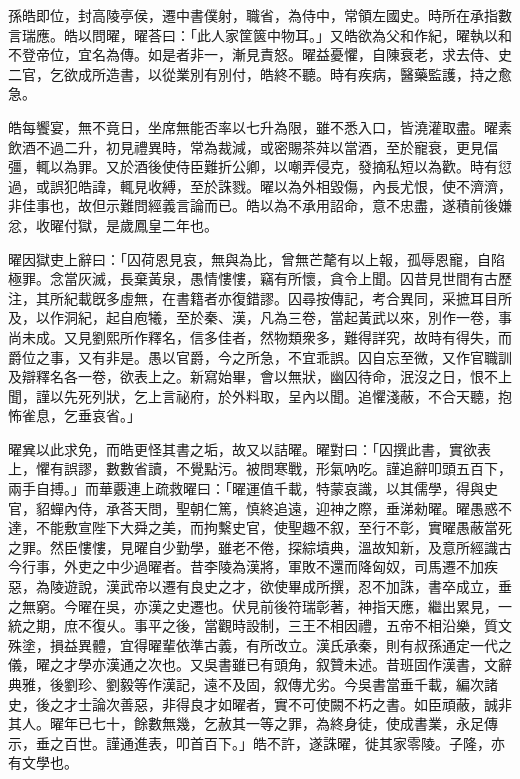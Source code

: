 \begin{pinyinscope}
 
 
 
 孫皓即位，封高陵亭侯，遷中書僕射，職省，為侍中，常領左國史。時所在承指數言瑞應。皓以問曜，曜荅曰：「此人家筐篋中物耳。」又皓欲為父和作紀，曜執以和不登帝位，宜名為傳。如是者非一，漸見責怒。曜益憂懼，自陳衰老，求去侍、史二官，乞欲成所造書，以從業別有別付，皓終不聽。時有疾病，醫藥監護，持之愈急。
 
 
 
 
 皓每饗宴，無不竟日，坐席無能否率以七升為限，雖不悉入口，皆澆灌取盡。曜素飲酒不過二升，初見禮異時，常為裁減，或密賜茶荈以當酒，至於寵衰，更見偪彊，輒以為罪。又於酒後使侍臣難折公卿，以嘲弄侵克，發摘私短以為歡。時有愆過，或誤犯皓諱，輒見收縛，至於誅戮。曜以為外相毀傷，內長尤恨，使不濟濟，非佳事也，故但示難問經義言論而已。皓以為不承用詔命，意不忠盡，遂積前後嫌忿，收曜付獄，是歲鳳皇二年也。
 
 
 
 
 曜因獄吏上辭曰：「囚荷恩見哀，無與為比，曾無芒氂有以上報，孤辱恩寵，自陷極罪。念當灰滅，長棄黃泉，愚情慺慺，竊有所懷，貪令上聞。囚昔見世間有古歷注，其所紀載旣多虛無，在書籍者亦復錯謬。囚尋按傳記，考合異同，采摭耳目所及，以作洞紀，起自庖犧，至於秦、漢，凡為三卷，當起黃武以來，別作一卷，事尚未成。又見劉熙所作釋名，信多佳者，然物類衆多，難得詳究，故時有得失，而爵位之事，又有非是。愚以官爵，今之所急，不宜乖誤。囚自忘至微，又作官職訓及辯釋名各一卷，欲表上之。新寫始畢，會以無狀，幽囚待命，泯沒之日，恨不上聞，謹以先死列狀，乞上言祕府，於外料取，呈內以聞。追懼淺蔽，不合天聽，抱怖雀息，乞垂哀省。」
 
 
 
 
 曜兾以此求免，而皓更怪其書之垢，故又以詰曜。曜對曰：「囚撰此書，實欲表上，懼有誤謬，數數省讀，不覺點污。被問寒戰，形氣吶吃。謹追辭叩頭五百下，兩手自搏。」而華覈連上疏救曜曰：「曜運值千載，特蒙哀識，以其儒學，得與史官，貂蟬內侍，承荅天問，聖朝仁篤，慎終追遠，迎神之際，垂涕勑曜。曜愚惑不達，不能敷宣陛下大舜之美，而拘繫史官，使聖趣不叙，至行不彰，實曜愚蔽當死之罪。然臣慺慺，見曜自少勤學，雖老不倦，探綜墳典，溫故知新，及意所經識古今行事，外吏之中少過曜者。昔李陵為漢將，軍敗不還而降匈奴，司馬遷不加疾惡，為陵遊說，漢武帝以遷有良史之才，欲使畢成所撰，忍不加誅，書卒成立，垂之無窮。今曜在吳，亦漢之史遷也。伏見前後符瑞彰著，神指天應，繼出累見，一統之期，庶不復乆。事平之後，當觀時設制，三王不相因禮，五帝不相沿樂，質文殊塗，損益異體，宜得曜輩依準古義，有所改立。漢氏承秦，則有叔孫通定一代之儀，曜之才學亦漢通之次也。又吳書雖已有頭角，叙贊未述。昔班固作漢書，文辭典雅，後劉珍、劉毅等作漢記，遠不及固，叙傳尤劣。今吳書當垂千載，編次諸史，後之才士論次善惡，非得良才如曜者，實不可使闕不朽之書。如臣頑蔽，誠非其人。曜年已七十，餘數無幾，乞赦其一等之罪，為終身徒，使成書業，永足傳示，垂之百世。謹通進表，叩首百下。」皓不許，遂誅曜，徙其家零陵。子隆，亦有文學也。
 
 
\end{pinyinscope}